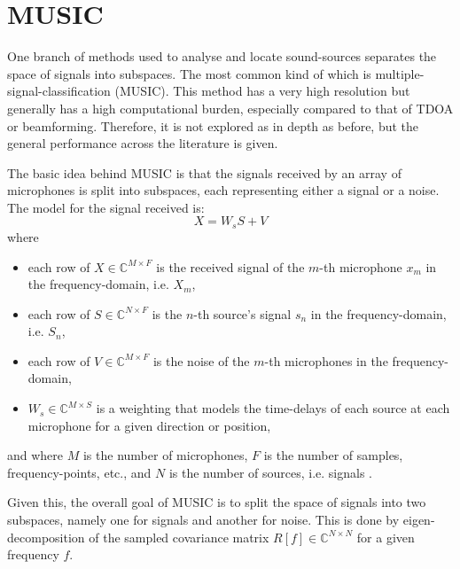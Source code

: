 \documentclass[notitlepage]{report}
\begin{document}
\section{MUSIC}

One branch of methods used to analyse and locate sound-sources separates the space of signals into subspaces. The most common kind of which is multiple-signal-classification (MUSIC). This method has a very high resolution but generally has a high computational burden, especially compared to that of TDOA or beamforming. Therefore, it is not explored as in depth as before, but the general performance across the literature is given.

The basic idea behind MUSIC is that the signals received by an array of microphones is split into subspaces, each representing either a signal or a noise. The model for the signal received is:
\begin{equation}
X = W_s S + V
\end{equation}
where 
\begin{itemize}
	\item each row of $X\in \mathbb{C}^{M\times F}$ is the received signal of the $m$-th microphone $x_m$ in the frequency-domain, i.e. $X_m$,
	\item each row of $S\in \mathbb{C}^{N\times F}$ is the $n$-th source's signal $s_n$ in the frequency-domain, i.e. $S_n$,
	\item each row of $V\in \mathbb{C}^{M\times F}$ is the noise of the $m$-th microphones in the frequency-domain,
	\item $W_s\in \mathbb{C}^{M\times S}$ is a weighting that models the time-delays of each source at each microphone for a given direction or position,
\end{itemize}
and where $M$ is the number of microphones, $F$ is the number of samples, frequency-points, etc., and $N$ is the number of sources, i.e. signals \cite{rascon_localization_2017}.

Given this, the overall goal of MUSIC is to split the space of signals into two subspaces, namely one for signals and another for noise. This is done by eigen-decomposition of the sampled covariance matrix $R[f]\in \mathbb{C}^{N\times N}$ for a given frequency $f$.
\end{document}
